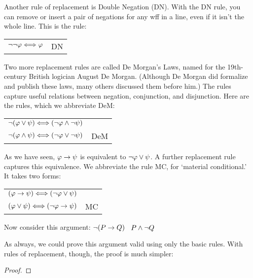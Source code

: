 Another rule of replacement is Double Negation (DN). With the DN rule, you can remove or insert a pair of negations for any wff in a line, even if it isn't the whole line. This is the rule:

\begin{center}
\begin{tabular}{rl}
$\neg\neg\varphi{} \Longleftrightarrow \varphi{}$ & DN
\end{tabular}
\end{center}

Two more replacement rules  are called De Morgan's Laws, named for the 19th-century British logician August De Morgan. (Although De Morgan did formalize and publish these laws, many others discussed them before him.) The rules capture useful relations between negation, conjunction, and disjunction. Here are the rules, which we abbreviate DeM:

\begin{center}
\begin{tabular}{rl}
$\neg(\varphi{}\vee\psi{}) \Longleftrightarrow (\neg\varphi{}\wedge\neg\psi{})$\\
$\neg(\varphi{}\wedge\psi{}) \Longleftrightarrow (\neg\varphi{}\vee\neg\psi{})$
& DeM
\end{tabular}
\end{center}

As we have seen, $\varphi{}\rightarrow\psi{}$ is equivalent to $\neg\varphi{}\vee\psi{}$. A further replacement rule captures this equivalence. We abbreviate the rule MC, for `material conditional.' It takes two forms:

\begin{center}
\begin{tabular}{rl}
$(\varphi{}\rightarrow\psi{}) \Longleftrightarrow (\neg\varphi{}\vee\psi{})$ &\\
$(\varphi{}\vee\psi{}) \Longleftrightarrow (\neg\varphi{}\rightarrow\psi{})$ & MC
\end{tabular}
\end{center}

Now consider this argument: $\neg(P \rightarrow Q)$ \therefore\ $P \wedge \neg Q$

As always, we could prove this argument valid using only the basic rules. With rules of replacement, though, the proof is much simpler:

\begin{proof}
	 \pr{}
\end{proof}

